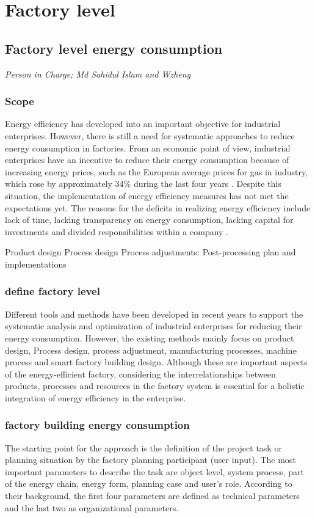 \newpage
\section{Factory level}
\subsection{Factory level energy consumption}
\label{chapter 4}

\textit{Person in Charge; Md Sahidul Islam and Wzheng}

\subsubsection{Scope}
Energy efficiency has developed into an important objective for industrial enterprises. However, there is still a need for systematic approaches to reduce energy consumption in factories. From an economic point of view, industrial enterprises have an incentive to reduce their energy consumption because of increasing energy prices, such as the European average prices for gas in industry, which rose by approximately 34\% during the last four years \cite{European2013}. 
Despite this situation, the implementation of energy efficiency measures has not met the expectations yet. The reasons for the deficits in realizing energy efficiency include lack of time, lacking transparency on energy consumption, lacking capital for investments and divided responsibilities within a company \cite{Fleiter2013}. 

Product design
Process design
Process adjustments:
Post-processing
plan and implementations


\subsubsection{define factory level}
Different tools and methods have been developed in recent years to support the systematic analysis and optimization of industrial enterprises for reducing their energy consumption. However, the existing methods mainly focus on product design, Process design, process adjustment, manufacturing processes, machine process and smart factory building design. Although these are important aspects of the energy-efficient factory, considering the interrelationships between products, processes and resources in the factory system is essential for a holistic integration of energy efficiency in the enterprise. 

\subsubsection{factory building energy consumption }
The starting point for the approach is the definition of the project task or planning situation by the factory planning participant (user input). The most important parameters to describe the task are object level, system process, part of the energy chain, energy form, planning case and user’s role. According to their background, the first four parameters are defined as technical parameters and the last two as organizational parameters. 

